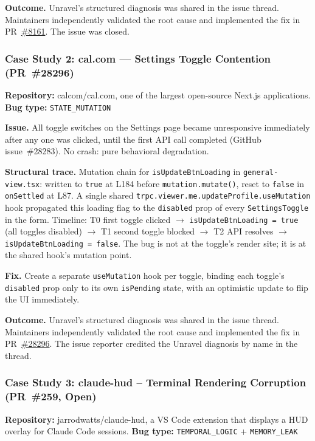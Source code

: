 \documentclass[12pt,a4paper]{article}
\newcommand{\code}[1]{\texttt{\small #1}}
\begin{document}
\textbf{Outcome.} Unravel's structured diagnosis was shared in the issue thread.
Maintainers independently validated the root cause and implemented the fix in
PR~\href{https://github.com/tldraw/tldraw/pull/8161}{\#8161}. The issue was closed.

\subsubsection{Case Study 2: cal.com — Settings Toggle Contention (PR~\#28296)}

\textbf{Repository:} calcom/cal.com, one of the largest open-source Next.js applications.
\quad\textbf{Bug type:} \code{STATE\_MUTATION}

\textbf{Issue.} All toggle switches on the Settings page became unresponsive immediately
after any one was clicked, until the first API call completed (GitHub issue~\#28283). No
crash: pure behavioral degradation.

\textbf{Structural trace.} Mutation chain for \code{isUpdateBtnLoading} in
\code{general-view.tsx}: written to \code{true} at L184 before \code{mutation.mutate()},
reset to \code{false} in \code{onSettled} at L87. A single shared
\code{trpc.viewer.me.updateProfile.useMutation} hook propagated this loading flag to the
\code{disabled} prop of every \code{SettingsToggle} in the form. Timeline: T0 first toggle
clicked $\to$ \code{isUpdateBtnLoading = true} (all toggles disabled) $\to$ T1 second
toggle blocked $\to$ T2 API resolves $\to$ \code{isUpdateBtnLoading = false}. The bug is
not at the toggle's render site; it is at the shared hook's mutation point.

\textbf{Fix.} Create a separate \code{useMutation} hook per toggle, binding each toggle's
\code{disabled} prop only to its own \code{isPending} state, with an optimistic update to
flip the UI immediately.

\textbf{Outcome.} Unravel's structured diagnosis was shared in the issue thread.
Maintainers independently validated the root cause and implemented the fix in
PR~\href{https://github.com/calcom/cal.com/pull/28296}{\#28296}. The issue reporter
credited the Unravel diagnosis by name in the thread.

\subsubsection{Case Study 3: claude-hud -- Terminal Rendering Corruption (PR~\#259, Open)}

\textbf{Repository:} jarrodwatts/claude-hud, a VS Code extension that displays a
HUD overlay for Claude Code sessions.
\quad\textbf{Bug type:} \code{TEMPORAL\_LOGIC} + \code{MEMORY\_LEAK}
\end{document}
